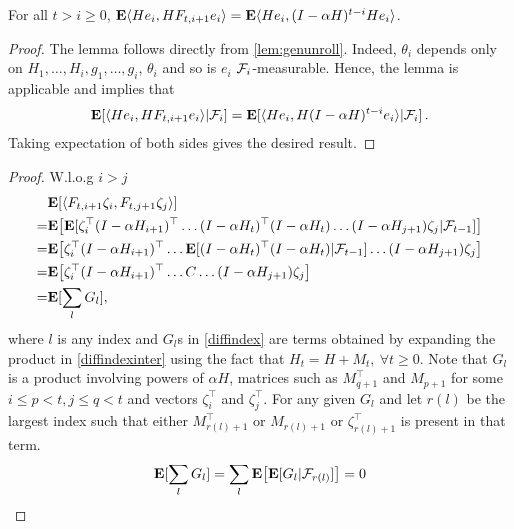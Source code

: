 \begin{lemma}\label{unroll}
For all $t>i\ge 0$, $\mathbf{E} \langle He_i,H F_{t,i+1} e_i\rangle=\mathbf{E}\langle He_i,(I-\alpha H)^{t-i}H e_i\rangle$.
\end{lemma}
\begin{proof}
The lemma follows directly from \cref{lem:genunroll}. Indeed, 
$\theta_i$ depends only on $H_1,\dots,H_{i},g_1,\dots,g_{i}$, $\theta_i$ and so is $e_i$ $\mathcal{F}_i$-measurable.
Hence, the lemma is applicable and implies that
\begin{align*}
\mathbf{E}[ \langle He_i, HF_{t,i+1} e_i\rangle | \mathcal{F}_i ] = 
\mathbf{E}[ \langle He_i, H (I-\alpha H)^{t-i} e_i\rangle | \mathcal{F}_i ]\,.
\end{align*}
Taking expectation of both sides gives the desired result.
\end{proof}

\begin{proof}
W.l.o.g  $i>j$
\begin{align}
&\mathbf{E}[\langle F_{t,i+1} \zeta_{i},F_{t,j+1} \zeta_{j}\rangle]\nonumber\\
\label{diffindexinter}=&\mathbf{E}\big[\mathbf{E}[ \zeta^\top_{i}(I-\alpha H_{i+1})^\top\ldots(I-\alpha H_t)^\top(I-\alpha H_t)\ldots(I-\alpha H_{j+1}) \zeta_{j}|\mathcal{F}_{t-1}]\big]\\
=&\mathbf{E}\big[ \zeta^\top_{i}(I-\alpha H_{i+1})^\top\ldots\mathbf{E}[(I-\alpha H_t)^\top(I-\alpha H_t)|\mathcal{F}_{t-1}]\ldots(I-\alpha H_{j+1}) \zeta_{j}\big]\\
=&\mathbf{E}\big[ \zeta^\top_{i}(I-\alpha H_{i+1})^\top\ldots C\ldots(I-\alpha H_{j+1}) \zeta_{j}\big]\\
\label{diffindex}=&\mathbf{E}[ \sum_{l} G_l],
\end{align}
where $l$ is any index and $G_l$s in \eqref{diffindex} are terms obtained by expanding the product in \eqref{diffindexinter} using the fact that $H_t=H+M_{t},~\forall t\geq 0$. Note that $G_l$ is a product involving powers of $\alpha H$, matrices such as $M^\top_{q+1}$ and $M_{p+1}$ for some $ i\leq p<t, j\leq q < t$ and vectors $\zeta^\top_i$ and $\zeta^\top_j$.
For any given $G_l$ and let $r(l)$ be the largest index such that either $M^\top_{r(l)+1}$ or $M_{r(l)+1}$ or $\zeta^\top_{r(l)+1}$ is present in that term.
\begin{align*}
\mathbf{E}[ \sum_{l} G_l]=  \sum_{l} \mathbf{E}\big[\mathbf{E}[G_l|\mathcal{F}_{r(l)}]\big]=0
\end{align*}
\end{proof}






